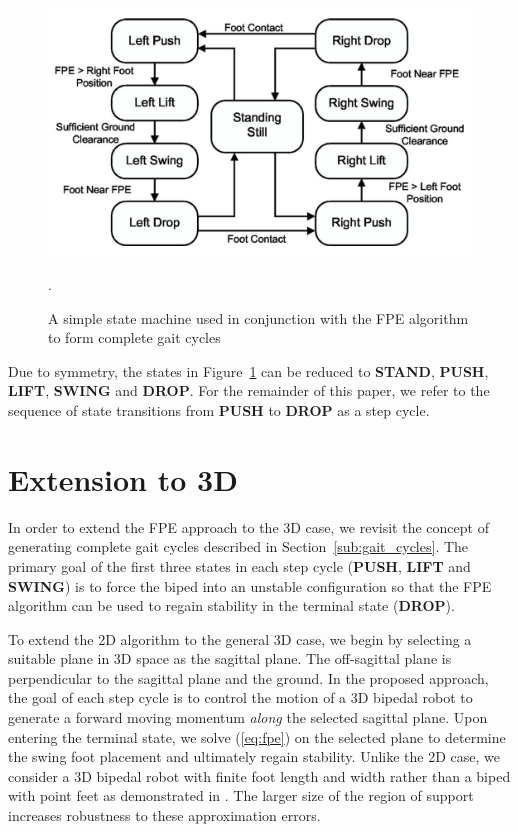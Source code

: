 \begin{figure}[b]
	\centering
    \includegraphics[scale=0.22]{fig/ch4/fpestatemachine.png}
  	\caption{A simple state machine used in conjunction with the FPE algorithm to form complete gait cycles}.
	\label{fig:statemachine}
\end{figure}

Due to symmetry, the states in Figure~\ref{fig:statemachine} can be reduced to \textbf{STAND}, \textbf{PUSH}, \textbf{LIFT}, \textbf{SWING} and \textbf{DROP}. For the remainder of this paper, we refer to the sequence of state transitions from \textbf{PUSH} to \textbf{DROP} as a step cycle.



\section{Extension to 3D} %
\label{sec:extension_to_3d}

In order to extend the FPE approach to the 3D case, we revisit the concept of generating complete gait cycles described in Section~\ref{sub:gait_cycles}. The primary goal of the first three states in each step cycle (\textbf{PUSH}, \textbf{LIFT} and \textbf{SWING}) is to force the biped into an unstable configuration so that the FPE algorithm can be used to regain stability in the terminal state (\textbf{DROP}).

To extend the 2D algorithm to the general 3D case, we begin by selecting a suitable plane in 3D space as the sagittal plane. The off-sagittal plane is perpendicular to the sagittal plane and the ground.  In the proposed approach, the goal of each step cycle is to control the motion of a 3D bipedal robot to generate a forward moving momentum \emph{along} the selected sagittal plane. Upon entering the terminal state, we solve (\ref{eq:fpe}) on the selected plane to determine the swing foot placement and ultimately regain stability. Unlike the 2D case, we consider a 3D bipedal robot with finite foot length and width rather than a biped with point feet as demonstrated in \cite{Wight:2008ii}. The larger size of the region of support increases robustness to these approximation errors. \\

